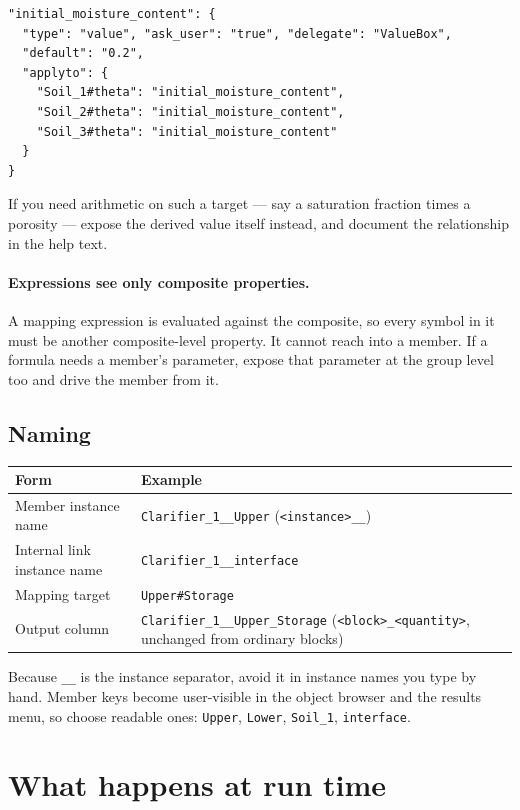 \documentclass[11pt,a4paper]{article}
\newcommand{\code}[1]{\texttt{\small #1}}
\begin{document}
\begin{lstlisting}
"initial_moisture_content": {
  "type": "value", "ask_user": "true", "delegate": "ValueBox",
  "default": "0.2",
  "applyto": {
    "Soil_1#theta": "initial_moisture_content",
    "Soil_2#theta": "initial_moisture_content",
    "Soil_3#theta": "initial_moisture_content"
  }
}
\end{lstlisting}

\noindent
If you need arithmetic on such a target --- say a saturation fraction times a
porosity --- expose the derived value itself instead, and document the
relationship in the help text.

\paragraph{Expressions see only composite properties.}
A mapping expression is evaluated against the composite, so every symbol in it
must be another composite-level property. It cannot reach into a member. If a
formula needs a member's parameter, expose that parameter at the group level
too and drive the member from it.

\subsection{Naming}

\begin{longtable}{@{}p{}p{}@{}}
\toprule
\textbf{Form} & \textbf{Example}\\
\midrule
\endhead
Member instance name & \code{Clarifier\_1\_\_Upper} \quad
(\code{<instance>\_\_<member key>})\\
Internal link instance name & \code{Clarifier\_1\_\_interface}\\
Mapping target & \code{Upper\#Storage}\\
Output column & \code{Clarifier\_1\_\_Upper\_Storage} \quad
(\code{<block>\_<quantity>}, unchanged from ordinary blocks)\\
\bottomrule
\end{longtable}

\noindent
Because \code{\_\_} is the instance separator, avoid it in instance names you
type by hand. Member keys become user-visible in the object browser and the
results menu, so choose readable ones: \code{Upper}, \code{Lower},
\code{Soil\_1}, \code{interface}.

\section{What happens at run time}
\end{document}
